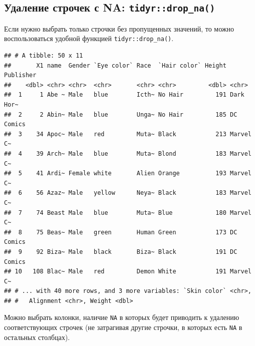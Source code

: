 \documentclass[]{book}
\newenvironment{Shaded}{\begin{snugshade}}{\end{snugshade}}
\newcommand{\KeywordTok}[1]{\textcolor[rgb]{0.13,0.29,0.53}{\textbf{#1}}}
\newcommand{\StringTok}[1]{\textcolor[rgb]{0.31,0.60,0.02}{#1}}
\newcommand{\OperatorTok}[1]{\textcolor[rgb]{0.81,0.36,0.00}{\textbf{#1}}}
\newcommand{\NormalTok}[1]{#1}
\begin{document}
\subsection{\texorpdfstring{Удаление строчек с NA:
\texttt{tidyr::drop\_na()}}{Удаление строчек с NA: tidyr::drop\_na()}}\label{tidy_drop_na}

Если нужно выбрать только строчки без пропущенных значений, то можно
воспользоваться удобной функцией \texttt{tidyr::drop\_na()}.

\begin{Shaded}
\end{Shaded}

\begin{verbatim}
## # A tibble: 50 x 11
##       X1 name  Gender `Eye color` Race  `Hair color` Height Publisher
##    <dbl> <chr> <chr>  <chr>       <chr> <chr>         <dbl> <chr>    
##  1     1 Abe ~ Male   blue        Icth~ No Hair         191 Dark Hor~
##  2     2 Abin~ Male   blue        Unga~ No Hair         185 DC Comics
##  3    34 Apoc~ Male   red         Muta~ Black           213 Marvel C~
##  4    39 Arch~ Male   blue        Muta~ Blond           183 Marvel C~
##  5    41 Ardi~ Female white       Alien Orange          193 Marvel C~
##  6    56 Azaz~ Male   yellow      Neya~ Black           183 Marvel C~
##  7    74 Beast Male   blue        Muta~ Blue            180 Marvel C~
##  8    75 Beas~ Male   green       Human Green           173 DC Comics
##  9    92 Biza~ Male   black       Biza~ Black           191 DC Comics
## 10   108 Blac~ Male   red         Demon White           191 Marvel C~
## # ... with 40 more rows, and 3 more variables: `Skin color` <chr>,
## #   Alignment <chr>, Weight <dbl>
\end{verbatim}

Можно выбрать колонки, наличие \texttt{NA} в которых будет приводить к
удалению соответствующих строчек (не затрагивая другие строчки, в
которых есть \texttt{NA} в остальных столбцах).

\begin{Shaded}
\end{Shaded}
\end{document}
